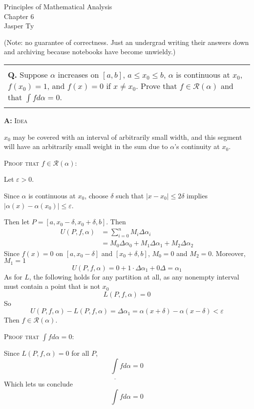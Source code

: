 \documentclass{article}
\newenvironment{myboxed}{\noindent\begin{tabular}{|p{.975\textwidth}|}\hline \\}{\\\\\hline\end{tabular}}
\newenvironment{mytitle}{\noindent\large\begin{flushright}}{\end{flushright}\normalsize}
\newcounter{Question}
\newenvironment{Question} 
{\bigskip\begin{myboxed}\refstepcounter{Question}\par\noindent\textbf{Q\theQuestion.}}
{\end{myboxed}\bigskip}
\newenvironment{Answer} {\par\noindent\textbf{A:}} {}
\begin{document}
\begin{mytitle}
    Principles of Mathematical Analysis \\
    Chapter 6 \\
    \normalsize Jasper Ty
\end{mytitle}

\noindent
\footnotesize 
(Note: no guarantee of correctness. Just an undergrad writing their answers down and archiving because notebooks have become unwieldy.)
\normalsize


\begin{Question}
    Suppose $\alpha$ increases on $[a, b]$, $a \leq x_0 \leq b$, $\alpha$ is continuous at $x_0$, $f(x_0) = 1$, and $f(x) = 0$ if $x \neq x_0$. Prove that $f \in \mathscr{R}(\alpha)$ and that $\int f d\alpha = 0$.
\end{Question}
\begin{Answer}
    \textsc{Idea}

    $x_0$ may be covered with an interval of arbitrarily small width, and this segment will have an arbitrarily small weight in the sum due to $\alpha$'s continuity at $x_0$.

    \textsc{Proof that $f \in \mathscr{R}(\alpha)$:}

    Let $\varepsilon > 0$.

    Since $\alpha$ is continuous at $x_0$, choose $\delta$ such that $|x-x_0| \leq 2\delta$ implies $|\alpha(x) - \alpha(x_0)| \leq \varepsilon$. 

    Then let $P = [a, x_0-\delta, x_0 + \delta, b]$. Then
    \begin{align*}
        U(P,f,\alpha) &= \sum_{i=0}^n M_i \Delta\alpha_i \\
        &= M_0 \Delta\alpha_0 + M_1 \Delta\alpha_1 + M_2 \Delta\alpha_2 
    \end{align*}
    Since $f(x) = 0$ on $[a, x_0 - \delta]$ and $[x_0 + \delta, b]$, $M_0 = 0$ and $M_2 = 0$. Moreover, $M_1 = 1$ 
    \[U(P,f,\alpha) = 0 + 1 \cdot \Delta\alpha_1 + 0 \Delta = \alpha_1\]
    As for $L$, the following holds for any partition at all, as any nonempty interval must contain a point that is not $x_0$
    \[L(P,f,\alpha) = 0\]
    So
    \[
        U(P,f,\alpha) - L(P, f, \alpha) = \Delta\alpha_1
        = \alpha(x+\delta) - \alpha(x-\delta) < \varepsilon\]
    Then $f \in \mathscr{R}(\alpha)$.

    \textsc{Proof that $\int fd\alpha = 0$:}

    Since $L(P,f,\alpha) = 0$ for all $P$, 
    \[\underline{\int}fd\alpha = 0\]
    Which lets us conclude 
    \[\int fd\alpha = 0\]
\end{Answer}
\end{document}
